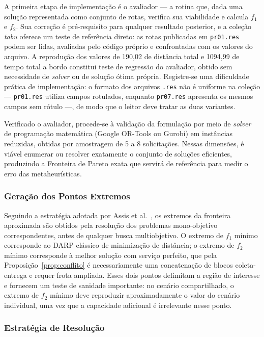 \documentclass[12pt,a4paper]{article}
\theoremstyle{plain}
\begin{document}
A primeira etapa de implementação é o avaliador --- a rotina que, dada uma solução representada como conjunto de rotas, verifica sua viabilidade e calcula $f_1$ e $f_2$. Sua correção é pré-requisito para qualquer resultado posterior, e a coleção \textit{tabu} oferece um teste de referência direto: as rotas publicadas em \texttt{pr01.res} podem ser lidas, avaliadas pelo código próprio e confrontadas com os valores do arquivo. A reprodução dos valores de 190,02 de distância total e 1094,99 de tempo total a bordo constitui teste de regressão do avaliador, obtido sem necessidade de \textit{solver} ou de solução ótima própria. Registre-se uma dificuldade prática de implementação: o formato dos arquivos \texttt{.res} não é uniforme na coleção --- \texttt{pr01.res} utiliza campos rotulados, enquanto \texttt{pr07.res} apresenta os mesmos campos sem rótulo ---, de modo que o leitor deve tratar as duas variantes.

Verificado o avaliador, procede-se à validação da formulação por meio de \textit{solver} de programação matemática (Google OR-Tools ou Gurobi) em instâncias reduzidas, obtidas por amostragem de 5 a 8 solicitações. Nessas dimensões, é viável enumerar ou resolver exatamente o conjunto de soluções eficientes, produzindo a Fronteira de Pareto exata que servirá de referência para medir o erro das metaheurísticas.

\subsubsection{Geração dos Pontos Extremos}

Seguindo a estratégia adotada por Assis et al.~\cite{assis2013}, os extremos da fronteira aproximada são obtidos pela resolução dos problemas mono-objetivo correspondentes, antes de qualquer busca multiobjetivo. O extremo de $f_1$ mínimo corresponde ao DARP clássico de minimização de distância; o extremo de $f_2$ mínimo corresponde à melhor solução com serviço perfeito, que pela Proposição~\ref{prop:conflito} é necessariamente uma concatenação de blocos coleta-entrega e requer frota ampliada. Esses dois pontos delimitam a região de interesse e fornecem um teste de sanidade importante: no cenário compartilhado, o extremo de $f_2$ mínimo deve reproduzir aproximadamente o valor do cenário individual, uma vez que a capacidade adicional é irrelevante nesse ponto.

\subsubsection{Estratégia de Resolução}
\end{document}
